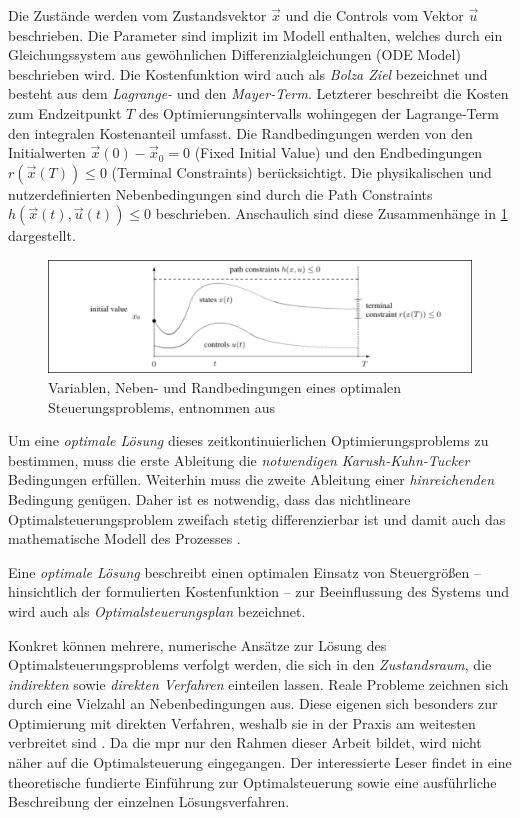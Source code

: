 Die Zustände werden vom Zustandsvektor $\vec{x}$ und die Controls vom Vektor $\vec{u}$ beschrieben. Die Parameter sind implizit im Modell enthalten, welches durch ein Gleichungssystem aus gewöhnlichen Differenzialgleichungen (ODE Model) beschrieben wird. Die Kostenfunktion wird auch als \textit{Bolza Ziel} bezeichnet und besteht aus dem \textit{Lagrange-} und den \textit{Mayer-Term}. Letzterer beschreibt die Kosten zum Endzeitpunkt $T$ des Optimierungsintervalls wohingegen der Lagrange-Term den integralen Kostenanteil umfasst. Die Randbedingungen werden von den Initialwerten $\vec{x}(0)-\vec{x}_{0} = 0$ (Fixed Initial Value) und den Endbedingungen $r(\vec{x}(T)) \leq 0$ (Terminal Constraints) berücksichtigt. Die physikalischen und nutzerdefinierten Nebenbedingungen sind durch die Path Constraints $h(\vec{x}(t),\vec{u}(t)) \leq 0$ beschrieben. Anschaulich sind diese Zusammenhänge in \ref{fig:opt} dargestellt.

\begin{figure}
\centering
\includegraphics[width=\textwidth]{abbildungen/20160327_mpc}
\caption[Variablen, Neben- und Randbedingungen eines optimalen Steuerungsproblems]{Variablen, Neben- und Randbedingungen eines optimalen Steuerungsproblems, entnommen aus \cite[S.61]{di14}}
\label{fig:opt}
\end{figure}

Um eine \textit{optimale Lösung} dieses zeitkontinuierlichen Optimierungsproblems zu bestimmen, muss die erste Ableitung die \textit{notwendigen} \textit{Karush-Kuhn-Tucker} Bedingungen erfüllen. Weiterhin muss die zweite Ableitung einer \textit{hinreichenden} Bedingung genügen. Daher ist es notwendig, dass das nichtlineare Optimalsteuerungsproblem zweifach stetig differenzierbar ist und damit auch das mathematische Modell des Prozesses \cite[S.~21ff.]{di14}.

Eine \textit{optimale Lösung} beschreibt einen optimalen Einsatz von Steuergrößen -- hinsichtlich der formulierten Kostenfunktion -- zur Beeinflussung des Systems und wird auch als \textit{Optimalsteuerungsplan} bezeichnet.

Konkret können mehrere, numerische Ansätze zur Lösung des Optimalsteuerungsproblems verfolgt werden, die sich in den \textit{Zustandsraum}, die \textit{indirekten} sowie \textit{direkten Verfahren} einteilen lassen. Reale Probleme zeichnen sich durch eine Vielzahl an Nebenbedingungen aus. Diese eigenen sich besonders zur Optimierung mit direkten Verfahren, weshalb sie in der Praxis am weitesten verbreitet sind \cite[S.~63]{di14}. 
Da die \acrlong{mpr} nur den Rahmen dieser Arbeit bildet, wird nicht näher auf die Optimalsteuerung eingegangen. Der interessierte Leser findet in \cite{di14} eine theoretische fundierte Einführung zur Optimalsteuerung sowie eine ausführliche Beschreibung der einzelnen Lösungsverfahren.


